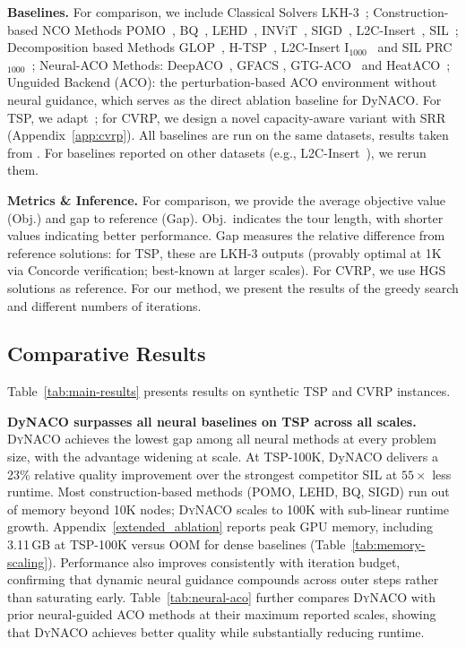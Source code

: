 \documentclass[sigconf]{acmart}
\newcommand{\TSP}{\textsc{TSP}}
\newcommand{\CVRP}{\textsc{CVRP}}
\newcommand{\DyNACO}{\textsc{DyNACO}}
\begin{document}
\smallskip\noindent\textbf{Baselines.}
For comparison, we include Classical Solvers LKH-3~\cite{lkhtsp, lkhcvrp}; Construction-based NCO Methods POMO~\cite{pomo}, BQ~\cite{bq}, LEHD~\cite{lehd}, INViT~\cite{invit}, SIGD~\cite{sigd}, L2C-Insert~\cite{l2c}, SIL~\cite{sil}; Decomposition based Methods GLOP~\cite{glop}, H-TSP~\cite{htsp}, L2C-Insert I$_{1000}$~\cite{l2c} and SIL PRC$_{1000}$~\cite{sil}; Neural-ACO Methods: DeepACO~\cite{deepaco}, GFACS \cite{gfacs}, GTG-ACO~\cite{gtgaco} and HeatACO~\cite{heataco}; Unguided Backend (ACO): the perturbation-based ACO environment without neural guidance, which serves as the direct ablation baseline for DyNACO. For TSP, we adapt~\cite{faco}; for CVRP, we design a novel capacity-aware variant with SRR (Appendix~\ref{app:cvrp}).
All baselines are run on the same datasets, results taken from \cite{l2c, sil}. For baselines reported on other datasets (e.g., L2C-Insert~\cite{l2c}), we rerun them.

\smallskip\noindent\textbf{Metrics \& Inference.}
For comparison, we provide the average objective value (Obj.) and gap to reference (Gap). Obj.\ indicates the tour length, with shorter values indicating better performance. Gap measures the relative difference from reference solutions: for \TSP{}, these are LKH-3 outputs (provably optimal at 1K via Concorde verification; best-known at larger scales). For \CVRP{}, we use HGS~\cite{hgs} solutions as reference.
For our method, we present the results of the greedy search and different numbers of iterations.

\subsection{Comparative Results}
\label{sec:main-results}

Table~\ref{tab:main-results} presents results on synthetic \TSP{} and \CVRP{} instances.

\smallskip\noindent\textbf{DyNACO surpasses all neural baselines on TSP across all scales.}
\DyNACO{} achieves the lowest gap among all neural methods at every problem size, with the advantage widening at scale.
At TSP-100K, DyNACO delivers a 23\% relative quality improvement over the strongest competitor SIL at $55{\times}$ less runtime.
Most construction-based methods (POMO, LEHD, BQ, SIGD) run out of memory beyond 10K nodes; \DyNACO{} scales to 100K with sub-linear runtime growth.
Appendix~\ref{extended_ablation} reports peak GPU memory, including 3.11\,GB at TSP-100K versus OOM for dense baselines (Table~\ref{tab:memory-scaling}).
Performance also improves consistently with iteration budget, confirming that dynamic neural guidance compounds across outer steps rather than saturating early. Table~\ref{tab:neural-aco} further compares \DyNACO{} with prior neural-guided ACO methods at their maximum reported scales, showing that \DyNACO{} achieves better quality while substantially reducing runtime.
\end{document}
